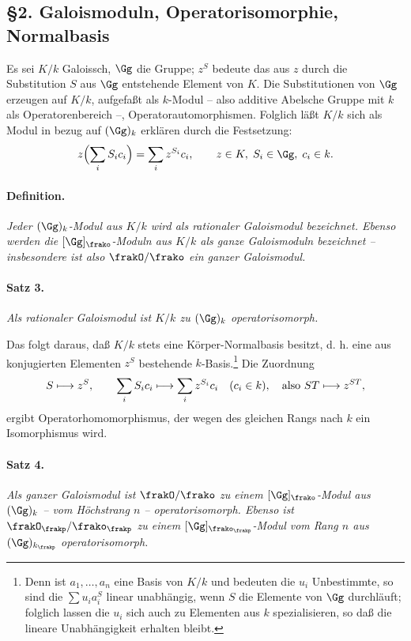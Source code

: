 \subsection*{§2. Galoismoduln, Operatorisomorphie, Normalbasis}

Es sei \(K/k\) Galoissch, \(\Gg\) die Gruppe; \(z^S\) bedeute das aus \(z\) durch die Substitution \(S\) aus \(\Gg\) entstehende Element von \(K\). Die Substitutionen von \(\Gg\) erzeugen auf \(K/k\), aufgefaßt als \(k\)-Modul -- also additive Abelsche Gruppe mit \(k\) als Operatorenbereich --, Operatorautomorphismen. Folglich läßt \(K/k\) sich als Modul in bezug auf \((\Gg)_k\) erklären durch die Festsetzung:
\[
        z\Bigl(\sum_i S_i c_i\Bigr)=\sum_i z^{S_i}c_i,
        \qquad z\in K,\; S_i\in\Gg,\; c_i\in k.
\]

\paragraph{Definition.}
\emph{Jeder \((\Gg)_k\)-Modul aus \(K/k\) wird als rationaler Galoismodul bezeichnet. Ebenso werden die \([\Gg]_\frako\)-Moduln aus \(K/k\) als ganze Galoismoduln bezeichnet -- insbesondere ist also \(\frakO/\frako\) ein ganzer Galoismodul.}

\paragraph{Satz 3.}
\emph{Als rationaler Galoismodul ist \(K/k\) zu \((\Gg)_k\) operatorisomorph.}

Das folgt daraus, daß \(K/k\) stets eine Körper-Normalbasis besitzt, d. h. eine aus konjugierten Elementen \(z^S\) bestehende \(k\)-Basis.\footnote{Denn ist \(a_1,\ldots,a_n\) eine Basis von \(K/k\) und bedeuten die \(u_i\) Unbestimmte, so sind die \(\sum u_i a_i^S\) linear unabhängig, wenn \(S\) die Elemente von \(\Gg\) durchläuft; folglich lassen die \(u_i\) sich auch zu Elementen aus \(k\) spezialisieren, so daß die lineare Unabhängigkeit erhalten bleibt.} Die Zuordnung
\[
        S\longmapsto z^S,
        \qquad
        \sum_i S_i c_i\longmapsto \sum_i z^{S_i}c_i
        \quad(c_i\in k),
        \quad\hbox{also } ST\longmapsto z^{ST},
\]
ergibt Operatorhomomorphismus, der wegen des gleichen Rangs nach \(k\) ein Isomorphismus wird.

\paragraph{Satz 4.}
\emph{Als ganzer Galoismodul ist \(\frakO/\frako\) zu einem \([\Gg]_\frako\)-Modul aus \((\Gg)_k\) -- vom Höchstrang \(n\) -- operatorisomorph. Ebenso ist \(\frakO_\frakp/\frako_\frakp\) zu einem \([\Gg]_{\frako_\frakp}\)-Modul vom Rang \(n\) aus \((\Gg)_{k_\frakp}\) operatorisomorph.}

